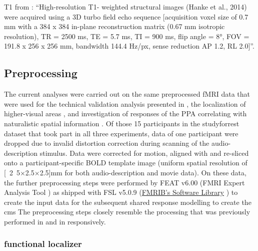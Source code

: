 %
T1 from \citep{ben2018hippocampal}: ``High-resolution T1- weighted structural
images (Hanke et al., 2014) were acquired using a 3D turbo field echo sequence
[acquisition voxel size of 0.7 mm with a 384 x 384 in-plane reconstruction
matrix (0.67 mm isotropic resolution), TR = 2500 ms, TE = 5.7 ms, TI = 900 ms,
flip angle = 8°, FOV = 191.8 x 256 x 256 mm, bandwidth 144.4 Hz/px, sense
reduction AP 1.2, RL 2.0]''.


\subsection{Preprocessing}


The current analyses were carried out on the same preprocessed fMRI data
\citep{hanke2016aligned} that were used for the technical validation analysis
presented in \citet{hanke2016simultaneous}, the localization of higher-visual
areas \citep{sengupta2016extension}, and investigation of responses of the PPA
correlating with naturalistic spatial information \citep{sengupta2016extension}.
Of those 15 participants in the studyforrest dataset that took part in all three
experiments, data of one participant were dropped due to invalid distortion
correction during scanning of the audio-description stimulus.
Data were corrected for motion, aligned with and re-sliced onto a
participant-specific BOLD template image \citep{sengupta2016extension} (uniform
spatial resolution of \unit[2.5$\times$2.5$\times$2.5]{mm} for both
audio-description and movie data).
On these data, the further preprocessing steps were performed by FEAT v6.00
(FMRI Expert Analysis Tool \citep{woolrich2001autocorr}) as shipped with FSL
v5.0.9 (\href{https://www.fmrib.ox.ac.uk/fsl}{FMRIB's Software Library}
\citep{smith2004fsl}) to create the input data for the subsequent shared
response modelling to create the \ac{cms}
%
The preprocessing steps closely resemble the processing that was previously
performed in \citet{sengupta2016extension} and in \citet{haeusler2022processing}
responsively.

%

\subsubsection{functional localizer}

